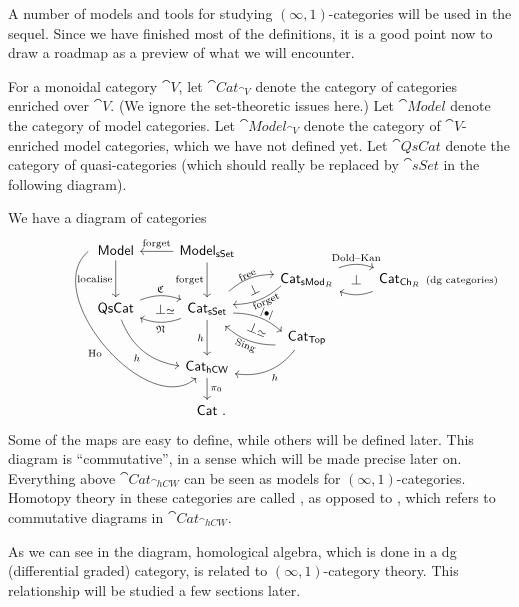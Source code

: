 A number of models and tools for studying $(\infty,1)$-categories 
will be used in the sequel. 
Since we have finished most of the definitions,
it is a good point now to draw a roadmap
as a preview of what we will encounter.

For a monoidal category $\cat V$,
let $\cat{Cat}_{\cat V}$ denote the category of categories enriched over $\cat V$.
(We ignore the set-theoretic issues here.)
Let $\cat{Model}$ denote the category of model categories.
Let $\cat{Model}_{\cat V}$ denote the category of $\cat V$-enriched model categories,
which we have not defined yet.
Let $\cat{QsCat}$ denote the category of quasi-categories
(which should really be replaced by $\cat{sSet}$ in the following diagram).

We have a diagram of categories 
\[\begin{tikzcd}[row sep=1ex]
    \cat{Model} \ar[dd,"\text{localise}"']
    \ar[ddddr,start anchor={[xshift=-.5ex]west},bend right=90,"\Ho"'] &
    \cat{Model}_{\cat{sSet}} \ar[l,"\text{forget}"'] 
    \ar[dd,"\text{forget}"'] \\ 
%
    && \cat{Cat}_{\cat{sMod}_R} \ar[r,bend left=20,"\text{Dold--Kan}"]
    \ar[r,phantom,"\bot"]
    \ar[dl,bend left=20,start anchor={[xshift=-1.5ex,yshift=1ex]},
    end anchor={[yshift=1ex]},pos=.7,"\text{forget}" {rotate=25,inner sep=1pt}] &
    \rlap{$\cat{Cat}_{\cat{Ch}_R}$\scriptsize\enspace(dg categories)}
    \phantom{\cat{Cat}_{\cat{sMod}_R}} \ar[l,bend left=20] \\
%
    \cat{QsCat} \ar[r,bend left=20,"\mathfrak C"]
    \ar[r,phantom,"\bot\rlap{$\scriptstyle\simeq$}"] \ar[ddr,bend right,"h"'] &
    \cat{Cat}_{\cat{sSet}} \ar[l,bend left=20,"\mathfrak N"] \ar[dd,"h"']
    \ar[ur,bend left=20,start anchor={[xshift=1ex,yshift=1ex]},
    end anchor={[yshift=.5ex]},pos=.75,"\text{free}" rotate=25]
    \ar[ur,phantom,yshift=1ex,"\bot" rotate=25]
    \ar[dr,bend left=20,start anchor={[yshift=-1ex]},
    end anchor={[xshift=-1.5ex,yshift=-1ex]},pos=.45,"|\bullet|" {rotate=-22,inner sep=1pt}]
    \ar[dr,phantom,yshift=-1ex,"\bot\scriptstyle\simeq" rotate=-22] \\
    &&\cat{Cat}_{\cat{Top}} \ar[dl,bend left,"h"]
    \ar[ul,bend left=20,start anchor={[xshift=-1ex,yshift=-1ex]},
    end anchor={[xshift=.5ex,yshift=-1ex]},pos=.25,"\operatorname{Sing}" rotate=-22]\\
%
    &\cat{Cat}_{\cat{hCW}} \ar[dd,"\pi_0"] \\ \  \\
    &\cat{Cat}\rlap{\ .}
\end{tikzcd}\hspace{3em}\]
Some of the maps are easy to define, while others will be defined later.
This diagram is ``commutative'', in a sense which will be made precise later on.
Everything above $\cat{Cat}_{\cat{hCW}}$ can be seen as
models for $(\infty,1)$-categories.
Homotopy theory in these categories are called ,
as opposed to , 
which refers to commutative diagrams in $\cat{Cat}_{\cat{hCW}}$.

As we can see in the diagram, homological algebra, which is done in a dg (differential graded) category,
is related to $(\infty,1)$-category theory.
This relationship will be studied a few sections later.

